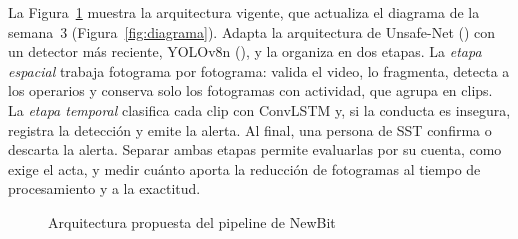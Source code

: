 \documentclass[12pt,a4paper]{article}
\makeatletter
\newcommand{\cita@revisar}[1]{\ifcsdef{ca@#1}{}{\PackageError{citas}{Cita no definida: #1}{}}}
\newcommand{\cita@par}[1]{\cita@revisar{#1}\cita@sep\csuse{ca@#1}, \csuse{cy@#1}\def\cita@sep{; }}
\newcommand{\parencite}[1]{(\def\cita@sep{}\forcsvlist{\cita@par}{#1})}
\makeatother
\begin{document}
La Figura~\ref{fig:arquitectura} muestra la arquitectura vigente, que actualiza el diagrama de la semana~3 (Figura~\ref{fig:diagrama}). Adapta la arquitectura de Unsafe-Net \parencite{onal2025} con un detector más reciente, YOLOv8n \parencite{yolov8}, y la organiza en dos etapas. La \textit{etapa espacial} trabaja fotograma por fotograma: valida el video, lo fragmenta, detecta a los operarios y conserva solo los fotogramas con actividad, que agrupa en clips. La \textit{etapa temporal} clasifica cada clip con ConvLSTM y, si la conducta es insegura, registra la detección y emite la alerta. Al final, una persona de SST confirma o descarta la alerta. Separar ambas etapas permite evaluarlas por su cuenta, como exige el acta, y medir cuánto aporta la reducción de fotogramas al tiempo de procesamiento y a la exactitud.

\begin{figure}[!htbp]
\caption{Arquitectura propuesta del pipeline de NewBit}\label{fig:arquitectura}
\centering
{}
\end{figure}
\end{document}

